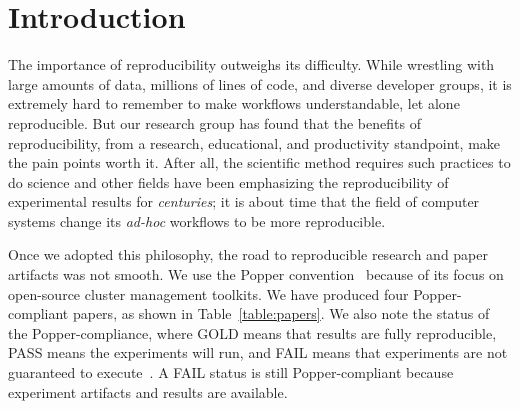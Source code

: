 \section{Introduction}

The importance of reproducibility outweighs its difficulty. While wrestling with
large amounts of data, millions of lines of code, and diverse developer groups, it
is extremely  hard to remember to make workflows understandable, let alone
reproducible. But our research group has found  that the benefits of
reproducibility, from a research, educational, and productivity standpoint,
make the pain points worth it. After all, the scientific method requires such
practices to do science and other fields have been emphasizing the
reproducibility of experimental results for {\it centuries}; it is about time
that the field of computer systems change its {\it ad-hoc} workflows to be more
reproducible.

Once we adopted this philosophy, the road to reproducible research and paper
artifacts was not smooth.  We use the Popper
convention~\cite{jimenez:ipdpsw17-popper} because of its focus on open-source
cluster management toolkits. We have produced four Popper-compliant papers, as
shown in Table~\ref{table:papers}. We also note the status of the
Popper-compliance, where GOLD means that results are fully reproducible, PASS
means the experiments will run, and FAIL means that experiments are not
guaranteed to execute~\cite{jimenez:rr18-popper}. A FAIL status is still
Popper-compliant because experiment artifacts and results are available.

